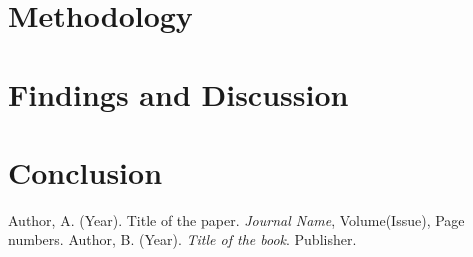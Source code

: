 \documentclass[a4paper, 12pt]{article}
\begin{document}
\section{Methodology}

\section{Findings and Discussion}

\section{Conclusion}

\begin{thebibliography}{9}
     Author, A. (Year). Title of the paper. \textit{Journal Name}, Volume(Issue), Page numbers.
     Author, B. (Year). \textit{Title of the book}. Publisher.
\end{thebibliography}
\end{document}
